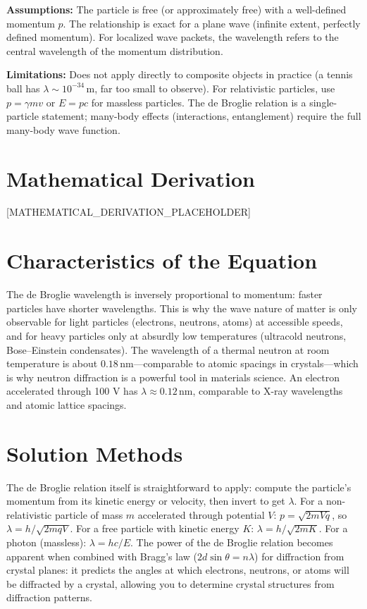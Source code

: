 \documentclass[11pt,openright]{book}
\begin{document}
\textbf{Assumptions:} The particle is free (or approximately free) with a well-defined momentum $p$. The relationship is exact for a plane wave (infinite extent, perfectly defined momentum). For localized wave packets, the wavelength refers to the central wavelength of the momentum distribution.


\textbf{Limitations:} Does not apply directly to composite objects in practice (a tennis ball has $\lambda \sim 10^{-34}\,\text{m}$, far too small to observe). For relativistic particles, use $p = \gamma mv$ or $E = pc$ for massless particles. The de Broglie relation is a single-particle statement; many-body effects (interactions, entanglement) require the full many-body wave function.


\section*{Mathematical Derivation}

[MATHEMATICAL_DERIVATION_PLACEHOLDER]

\section*{Characteristics of the Equation}

The de Broglie wavelength is inversely proportional to momentum: faster particles have shorter wavelengths. This is why the wave nature of matter is only observable for light particles (electrons, neutrons, atoms) at accessible speeds, and for heavy particles only at absurdly low temperatures (ultracold neutrons, Bose--Einstein condensates). The wavelength of a thermal neutron at room temperature is about $0.18\,\text{nm}$---comparable to atomic spacings in crystals---which is why neutron diffraction is a powerful tool in materials science. An electron accelerated through 100 V has $\lambda \approx 0.12\,\text{nm}$, comparable to X-ray wavelengths and atomic lattice spacings.
\section*{Solution Methods}

The de Broglie relation itself is straightforward to apply: compute the particle's momentum from its kinetic energy or velocity, then invert to get $\lambda$. For a non-relativistic particle of mass $m$ accelerated through potential $V$: $p = \sqrt{2mVq}$, so $\lambda = h/\sqrt{2mqV}$. For a free particle with kinetic energy $K$: $\lambda = h/\sqrt{2mK}$. For a photon (massless): $\lambda = hc/E$. The power of the de Broglie relation becomes apparent when combined with Bragg's law ($2d\sin\theta = n\lambda$) for diffraction from crystal planes: it predicts the angles at which electrons, neutrons, or atoms will be diffracted by a crystal, allowing you to determine crystal structures from diffraction patterns.
\end{document}
